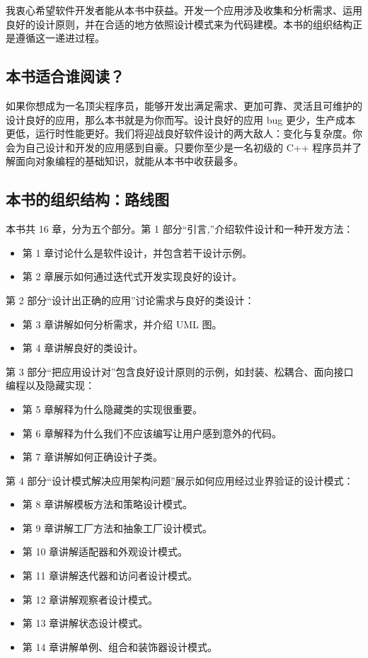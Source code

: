 我衷心希望软件开发者能从本书中获益。开发一个应用涉及收集和分析需求、运用良好的设计原则，并在合适的地方依照设计模式来为代码建模。本书的组织结构正是遵循这一递进过程。

\subsection{本书适合谁阅读？}

如果你想成为一名顶尖程序员，能够开发出满足需求、更加可靠、灵活且可维护的设计良好的应用，那么本书就是为你而写。设计良好的应用 bug 更少，生产成本更低，运行时性能更好。我们将迎战良好软件设计的两大敌人：变化与复杂度。你会为自己设计和开发的应用感到自豪。只要你至少是一名初级的 C++ 程序员并了解面向对象编程的基础知识，就能从本书中收获最多。

\subsection{本书的组织结构：路线图}

本书共 16 章，分为五个部分。第 1 部分“引言\emph{,}”介绍软件设计和一种开发方法：

\begin{itemize}
\item 第 1 章讨论什么是软件设计，并包含若干设计示例。
\item 第 2 章展示如何通过迭代式开发实现良好的设计。
\end{itemize}

第 2 部分“设计出正确的应用”讨论需求与良好的类设计：

\begin{itemize}
\item 第 3 章讲解如何分析需求，并介绍 UML 图。
\item 第 4 章讲解良好的类设计。
\end{itemize}

第 3 部分“把应用设计对”包含良好设计原则的示例，如封装、松耦合、面向接口编程以及隐藏实现：

\begin{itemize}
\item 第 5 章解释为什么隐藏类的实现很重要。
\item 第 6 章解释为什么我们不应该编写让用户感到意外的代码。
\item 第 7 章讲解如何正确设计子类。
\end{itemize}

第 4 部分“设计模式解决应用架构问题”展示如何应用经过业界验证的设计模式：

\begin{itemize}
\item 第 8 章讲解模板方法和策略设计模式。
\item 第 9 章讲解工厂方法和抽象工厂设计模式。
\item 第 10 章讲解适配器和外观设计模式。
\item 第 11 章讲解迭代器和访问者设计模式。
\item 第 12 章讲解观察者设计模式。
\item 第 13 章讲解状态设计模式。
\item 第 14 章讲解单例、组合和装饰器设计模式。
\end{itemize}

